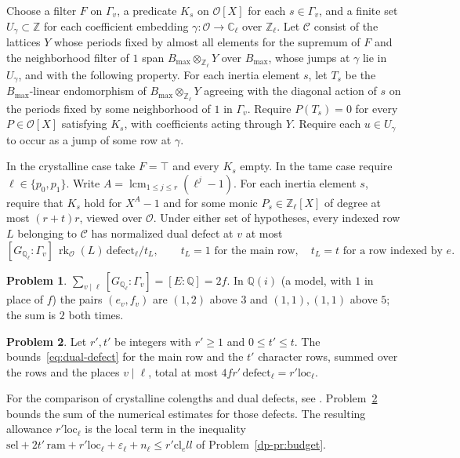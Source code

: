 \documentclass[reqno]{amsart}
\theoremstyle{definition}
\newtheorem{problem}{Problem}[section]
\theoremstyle{plain}
\newcommand{\Z}{\mathbb{Z}}
\newcommand{\Q}{\mathbb{Q}}
\newcommand{\C}{\mathbb{C}}
\newcommand{\Oc}{\mathcal{O}}
\newcommand{\rk}{\operatorname{rk}}
\newcommand{\loc}{\mathrm{loc}}
\newcommand{\defect}{\mathrm{defect}}
\newcommand{\cl}{\mathrm{cl}}
\newcommand{\Gl}{G_{\Q_\ell}}
\begin{document}
Choose a filter \(F\) on \(\Gamma_v\), a predicate \(K_s\) on \(\Oc[X]\) for each \(s\in\Gamma_v\), and a finite set \(U_\gamma\subset\Z\) for each coefficient embedding \(\gamma\colon\Oc\to\C_\ell\) over \(\Z_\ell\).  Let \(\mathcal C\) consist of the lattices \(Y\) whose periods fixed by almost all elements for the supremum of \(F\) and the neighborhood filter of \(1\) span \(B_{\max}\otimes_{\Z_\ell}Y\) over \(B_{\max}\), whose jumps at \(\gamma\) lie in \(U_\gamma\), and with the following property.  For each inertia element \(s\), let \(T_s\) be the \(B_{\max}\)-linear endomorphism of \(B_{\max}\otimes_{\Z_\ell}Y\) agreeing with the diagonal action of \(s\) on the periods fixed by some neighborhood of \(1\) in \(\Gamma_v\).  Require \(P(T_s)=0\) for every \(P\in\Oc[X]\) satisfying \(K_s\), with coefficients acting through \(Y\).  Require each \(u\in U_\gamma\) to occur as a jump of some row at \(\gamma\).

In the crystalline case take \(F=\top\) and every \(K_s\) empty.  In the tame case require \(\ell\in\{p_0,p_1\}\).  Write \(A=\operatorname{lcm}_{1\le j\le r}(\ell^j-1)\).  For each inertia element \(s\), require that \(K_s\) hold for \(X^A-1\) and for some monic \(P_s\in\Z_\ell[X]\) of degree at most \((r+t)r\), viewed over \(\Oc\).  Under either set of hypotheses, every indexed row \(L\) belonging to \(\mathcal C\) has normalized dual defect at \(v\) at most
\begin{equation}\label{eq:dual-defect}
  [\Gl : \Gamma_v]\,\rk_{\Oc}(L)\,\defect_\ell / t_L, \qquad t_L = 1 \text{ for the main row},\quad t_L = t \text{ for a row indexed by } e.
\end{equation}

\begin{problem}\label{pr:local-degrees}
\(\sum_{v \mid \ell} [\Gl : \Gamma_v] = [E : \Q] = 2f\).  In \(\Q(i)\) (a model, with \(1\) in place of \(f\)) the pairs \((e_v, f_v)\) are \((1, 2)\) above \(3\) and \((1, 1), (1, 1)\) above \(5\); the sum is \(2\) both times.
\end{problem}

\begin{problem}\label{pr:row-total}
Let \(r',t'\) be integers with \(r'\ge1\) and \(0\le t'\le t\).  The bounds~\eqref{eq:dual-defect} for the main row and the \(t'\) character rows, summed over the rows and the places \(v \mid \ell\), total at most \(4fr'\,\defect_\ell = r'\loc_\ell\).
\end{problem}

For the comparison of crystalline colengths and dual defects, see \cite{GL}.  Problem~\ref{pr:row-total} bounds the sum of the numerical estimates for those defects.  The resulting allowance \(r'\loc_\ell\) is the local term in the inequality \(\mathrm{sel} + 2t'\,\mathrm{ram} + r'\loc_\ell + \varepsilon_\ell + n_\ell \le r'\cl_ell\) of Problem~\ref{dp-pr:budget}.
\end{document}
